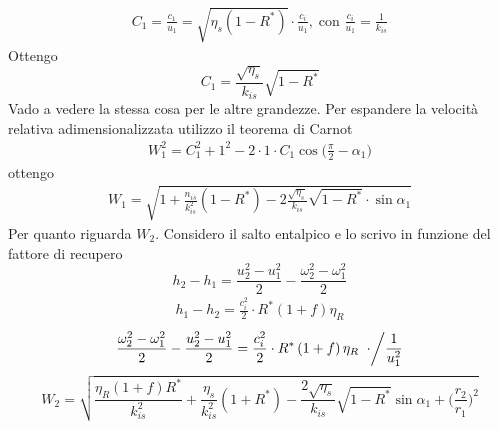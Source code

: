 \begin{align*}
C_1 = \frac{c_1}{u_1} = \sqrt{\eta_s \left(1- R^* \right)} \cdot \frac{c_i}{u_1}, \; \mbox{con } \frac{c_i}{u_1} = \frac{1}{k_{is}}
\end{align*}
Ottengo
\begin{equation}
\boxed{ C_1 = \frac{\sqrt{\eta_s}}{k_{is}} \sqrt{1 - R^*} }
\end{equation}
Vado a vedere la stessa cosa per le altre grandezze. Per espandere la velocità relativa adimensionalizzata utilizzo il teorema di Carnot
\begin{align*}
W_1^2 = C_1^2 + 1^2 - 2 \cdot 1 \cdot C_1 \cos \big( \frac{\pi}{2} - \alpha_1 \big)
\end{align*}
ottengo
\begin{align*}
\boxed{ W_1 = \sqrt{1 + \frac{n_{is}}{k_{is}^2} \left( 1 - R^* \right) - 2 \frac{\sqrt{\eta_s}}{k_{is}} \sqrt{1-R^*} \cdot \sin \alpha_1}}
\end{align*}
Per quanto riguarda $W_2$. Considero il salto entalpico e lo scrivo in funzione del fattore di recupero
\begin{equation}
h_2 - h_1 = \frac{u_2^2 - u_1^2}{2} - \frac{\omega_2^2 - \omega_1^2}{2}
\end{equation}
\begin{align*}
h_1 - h_2 = \frac{c_i^2}{2} \cdot R^* \left( 1 + f \right) \eta_R
\end{align*}
\begin{align*}
\left. \frac{\omega_2^2 - \omega_1^2}{2} - \frac{u_2^2 - u_1^2}{2} = \frac{c_i^2}{2} \cdot R^* \left( 1 + f \right) \eta_R \; \; \cdot \middle/ \frac{1}{u_1^2} \right.
\end{align*}
\begin{equation}
\boxed{W_2 = \sqrt{\frac{\eta_R \left( 1 + f \right) R^*}{k_{is}^2} + \frac{\eta_s}{k_{is}^2}  \left(1 + R^* \right) - \frac{2 \sqrt{\eta_s}}{k_{is}} \sqrt{1 - R^*} \sin \alpha_1 + \bigg(\frac{r_2}{r_1} \bigg)^2 } }
\end{equation}

